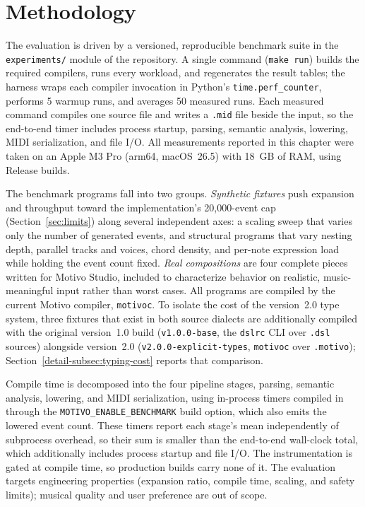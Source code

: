 \section{Methodology}\label{sec:evaluation-methodology}

The evaluation is driven by a versioned, reproducible benchmark suite in the \texttt{experiments/} module of the
repository.
A single command (\texttt{make run}) builds the required compilers, runs every workload, and regenerates the result
tables; the harness wraps each compiler invocation in Python's \texttt{time.perf\_counter}, performs 5 warmup runs, and
averages 50 measured runs.
Each measured command compiles one source file and writes a \texttt{.mid} file beside the input, so the end-to-end timer
includes process startup, parsing, semantic analysis, lowering, MIDI serialization, and file I/O.
All measurements reported in this chapter were taken on an Apple M3 Pro (arm64, macOS~26.5) with 18~GB of RAM, using
Release builds.

The benchmark programs fall into two groups.
\textit{Synthetic fixtures} push expansion and throughput toward the implementation's 20,000-event cap
(Section~\ref{sec:limits}) along several independent axes: a scaling sweep that varies only the number of generated
events, and structural programs that vary nesting depth, parallel tracks and voices, chord density, and per-note
expression load while holding the event count fixed.
\textit{Real compositions} are four complete pieces written for Motivo Studio, included to characterize behavior on
realistic, music-meaningful input rather than worst cases.
All programs are compiled by the current Motivo compiler, \texttt{motivoc}.
To isolate the cost of the version~2.0 type system, three fixtures that exist in both source dialects are additionally
compiled with the original version~1.0 build (\texttt{v1.0.0-base}, the \texttt{dslrc} CLI over \texttt{.dsl} sources)
alongside version~2.0 (\texttt{v2.0.0-explicit-types}, \texttt{motivoc} over \texttt{.motivo});
Section~\ref{detail-subsec:typing-cost} reports that comparison.

Compile time is decomposed into the four pipeline stages, parsing, semantic analysis, lowering, and MIDI serialization,
using in-process timers compiled in through the \texttt{MOTIVO\_ENABLE\_BENCHMARK} build option, which also emits the
lowered event count.
These timers report each stage's mean independently of subprocess overhead, so their sum is smaller than the end-to-end
wall-clock total, which additionally includes process startup and file I/O.
The instrumentation is gated at compile time, so production builds carry none of it.
The evaluation targets engineering properties (expansion ratio, compile time, scaling, and safety limits); musical
quality and user preference are out of scope.

